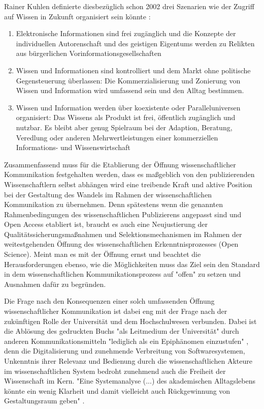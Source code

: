 Rainer Kuhlen definierte diesbezüglich schon 2002 drei Szenarien wie der Zugriff auf Wissen in Zukunft organisiert sein könnte \cite{Kuhlen_2002_universalaccess}:
\begin{enumerate}
\item Elektronische Informationen sind frei zugänglich und die Konzepte der individuellen Autorenschaft und des geistigen Eigentums werden zu Relikten aus bürgerlichen Vorinformationsgesellschaften
\item Wissen und Informationen sind kontrolliert und dem Markt ohne politische Gegensteuerung überlassen: Die Kommerzialisierung und Zonierung von Wissen und Information wird umfassend sein und den Alltag bestimmen.
\item Wissen und Information werden über koexistente oder Paralleluniversen organisiert: Das Wissens als Produkt ist frei, öffentlich zugänglich und nutzbar. Es bleibt aber genug Spielraum bei der Adaption, Beratung, Veredlung oder anderen Mehrwertleistungen einer kommerziellen Informations- und Wissenswirtschaft
\end{enumerate}

Zusammenfassend muss für die Etablierung der Öffnung wissenschaftlicher Kommunikation festgehalten werden, dass es maßgeblich von den publizierenden Wissenschaftlern selbst abhängen wird eine treibende Kraft und aktive Position bei der Gestaltung des Wandels im Rahmen der wissenschaftlichen Kommunikation zu übernehmen. Denn spätestens wenn die genannten Rahmenbedingungen des wissenschaftlichen Publizierens angepasst sind und Open Access etabliert ist, braucht es auch eine Neujustierung der Qualitätssicherungsmaßnahmen und Selektionsmechanismen im Rahmen der weitestgehenden Öffnung des wissenschaftlichen Erkenntnisprozesses (Open Science). Meint man es mit der Öffnung ernst und beachtet die Herausforderungen ebenso, wie die Möglichkeiten muss das Ziel sein den Standard in dem wissenschaftlichen Kommunikationsprozess auf "offen" zu setzen und Ausnahmen dafür zu begründen.

Die Frage nach den Konsequenzen einer solch umfassenden Öffnung wissenschaftlicher Kommunikation ist dabei eng mit der Frage nach der zukünftigen Rolle der Universität und dem Hochschulwesen verbunden. Dabei ist die Ablösung des gedruckten Buchs "als Leitmedium der Universität" durch anderen Kommunikationsmitteln "lediglich als ein Epiphänomen einzustufen" \cite{Warnke_2012}, denn die Digitalisierung und zunehmende Verbreitung von Softwaresystemen, Unkenntnis ihrer Relevanz und Bedienung durch die wissenschaftlichen Akteure im wissenschaftlichen System bedroht zunehmend auch die Freiheit der Wissenschaft im Kern. "Eine Systemanalyse (...) des akademischen Alltagslebens  könnte ein wenig Klarheit und damit vielleicht auch Rückgewinnung von Gestaltungsraum geben" \cite{Warnke_2012}.

